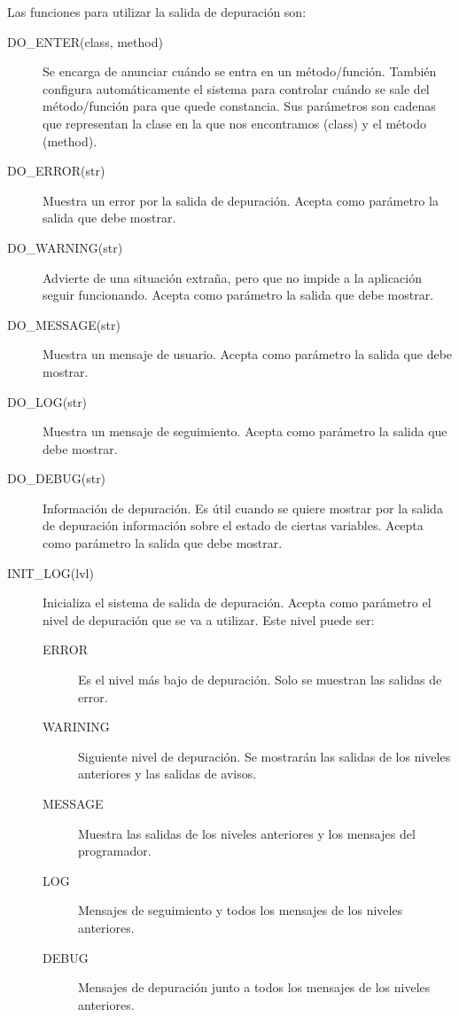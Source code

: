 Las funciones para utilizar la salida de depuración son:

\begin{description}
	\item[DO\_ENTER(class, method)] Se encarga de anunciar cuándo se entra en un método/función. También configura automáticamente el sistema para controlar cuándo se sale del método/función para que quede constancia. Sus parámetros son cadenas que representan la clase en la que nos encontramos (class) y el método (method).
	
	\item[DO\_ERROR(str)] Muestra un error por la salida de depuración. Acepta como parámetro la salida que debe mostrar.

	\item[DO\_WARNING(str)] Advierte de una situación extraña, pero que no impide a la aplicación seguir funcionando. Acepta como parámetro la salida que debe mostrar.

	\item[DO\_MESSAGE(str)] Muestra un mensaje de usuario. Acepta como parámetro la salida que debe mostrar.

	\item[DO\_LOG(str)] Muestra un mensaje de seguimiento. Acepta como parámetro la salida que debe mostrar.
	
	\item[DO\_DEBUG(str)] Información de depuración. Es útil cuando se quiere mostrar por la salida de depuración información sobre el estado de ciertas variables. Acepta como parámetro la salida que debe mostrar.

	\item[INIT\_LOG(lvl)] Inicializa el sistema de salida de depuración. Acepta como parámetro el nivel de depuración que se va a utilizar. Este nivel puede ser:
	\begin{description}
		\item[ERROR] Es el nivel más bajo de depuración. Solo se muestran las salidas de error.
		
		\item[WARINING] Siguiente nivel de depuración. Se mostrarán las salidas de los niveles anteriores y las salidas de avisos.
		
		\item[MESSAGE] Muestra las salidas de los niveles anteriores y los mensajes del programador.
		
		\item[LOG] Mensajes de seguimiento y todos los mensajes de los niveles anteriores.

		\item[DEBUG] Mensajes de depuración junto a todos los mensajes de los niveles anteriores.
	\end{description}
\end{description}
